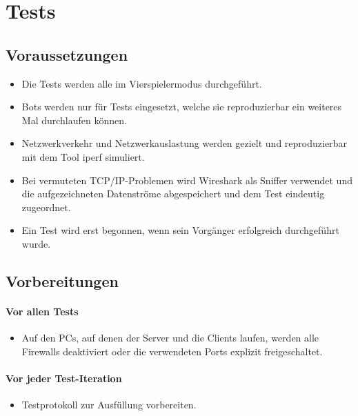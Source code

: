 \documentclass[12pt,halfparskip]{scrartcl}
\begin{document}

\section{Tests}
\subsection{Voraussetzungen}
\begin{itemize}
	\item Die Tests werden alle im Vierspielermodus durchgeführt.
	\item Bots werden nur für Tests eingesetzt, welche sie reproduzierbar ein weiteres Mal durchlaufen können.
	\item Netzwerkverkehr und Netzwerkauslastung werden gezielt und reproduzierbar mit dem Tool iperf simuliert.
	\item Bei vermuteten TCP/IP-Problemen wird Wireshark als Sniffer verwendet und die aufgezeichneten Datenströme abgespeichert und dem Test eindeutig zugeordnet.
	\item Ein Test wird erst begonnen, wenn sein Vorgänger erfolgreich durchgeführt wurde.
\end{itemize}

\subsection{Vorbereitungen}
\paragraph{Vor allen Tests}\label{ssub:vorbereitungen_vor_allen_tests} 
	\begin{itemize}
		\item Auf den PCs, auf denen der Server und die Clients laufen, werden alle Firewalls deaktiviert oder die verwendeten Ports explizit freigeschaltet.
	\end{itemize}

\paragraph{Vor jeder Test-Iteration}\label{ssub:vorbereitungen_vor_jeder_testiteration}
	\begin{itemize}
		\item Testprotokoll zur Ausfüllung vorbereiten.
	\end{itemize}
\end{document}
